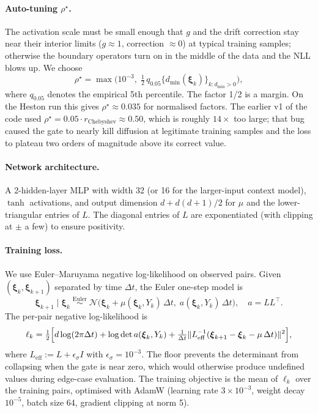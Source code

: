 \documentclass[11pt]{article}
\newcommand{\xib}{\boldsymbol{\xi}}
\newcommand{\1}{\mathbf{1}}
\begin{document}
\paragraph{Auto-tuning $\rho^\star$.}
The activation scale must be small enough that $g$ and the drift correction stay near their interior limits ($g \approx 1$, correction $\approx 0$) at typical training samples; otherwise the boundary operators turn on in the middle of the data and the NLL blows up. We choose
\begin{equation}
\rho^\star = \max\bigl( 10^{-3},\; \tfrac{1}{2}\, q_{0.05}\bigl\{ d_{\min}(\xib_k)\bigr\}_{k : d_{\min} > 0} \bigr),
\label{eq:rhostar}
\end{equation}
where $q_{0.05}$ denotes the empirical 5th percentile. The factor 1/2 is a margin. On the Heston run this gives $\rho^\star \approx 0.035$ for normalised factors. The earlier v1 of the code used $\rho^\star = 0.05 \cdot r_{\text{Chebyshev}} \approx 0.50$, which is roughly $14\times$ too large; that bug caused the gate to nearly kill diffusion at legitimate training samples and the loss to plateau two orders of magnitude above its correct value.

\paragraph{Network architecture.}
A 2-hidden-layer MLP with width 32 (or 16 for the larger-input context model), $\tanh$ activations, and output dimension $d + d(d+1)/2$ for $\mu$ and the lower-triangular entries of $L$. The diagonal entries of $L$ are exponentiated (with clipping at $\pm$ a few) to ensure positivity.

\paragraph{Training loss.}
We use Euler--Maruyama negative log-likelihood on observed pairs. Given $(\xib_k, \xib_{k+1})$ separated by time $\Delta t$, the Euler one-step model is
\begin{equation}
\xib_{k+1} \mid \xib_k \;\overset{\text{Euler}}{\sim}\; \mathcal N\bigl(\xib_k + \mu(\xib_k, Y_k)\,\Delta t,\; a(\xib_k, Y_k)\,\Delta t\bigr),
\quad a = L L^\top.
\end{equation}
The per-pair negative log-likelihood is
\begin{equation}
\ell_k = \tfrac{1}{2}\Bigl[d \log(2\pi \Delta t) + \log\det a(\xib_k, Y_k) + \tfrac{1}{\Delta t} \|L^{-1}_{\text{eff}}(\xib_{k+1} - \xib_k - \mu\,\Delta t)\|^2\Bigr],
\label{eq:euler-nll}
\end{equation}
where $L_{\text{eff}} := L + \epsilon_\sigma I$ with $\epsilon_\sigma = 10^{-3}$. The floor prevents the determinant from collapsing when the gate is near zero, which would otherwise produce undefined values during edge-case evaluation. The training objective is the mean of $\ell_k$ over the training pairs, optimised with AdamW (learning rate $3\times 10^{-3}$, weight decay $10^{-5}$, batch size 64, gradient clipping at norm 5).
\end{document}
